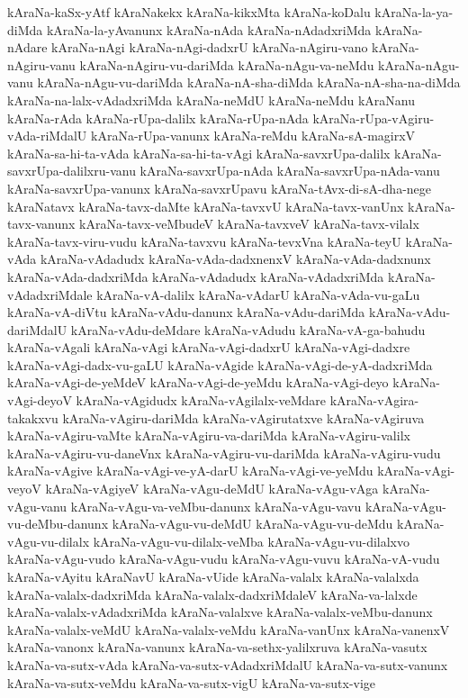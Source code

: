 {kAraNa-kaSx-yAtf
kAraNakekx
kAraNa-kikxMta
kAraNa-koDalu
kAraNa-la-ya-diMda
kAraNa-la-yAvanunx
kAraNa-nAda
kAraNa-nAdadxriMda
kAraNa-nAdare
kAraNa-nAgi
kAraNa-nAgi-dadxrU
kAraNa-nAgiru-vano
kAraNa-nAgiru-vanu
kAraNa-nAgiru-vu-dariMda
kAraNa-nAgu-va-neMdu
kAraNa-nAgu-vanu
kAraNa-nAgu-vu-dariMda
kAraNa-nA-sha-diMda
kAraNa-nA-sha-na-diMda
kAraNa-na-lalx-vAdadxriMda
kAraNa-neMdU
kAraNa-neMdu
kAraNanu
kAraNa-rAda
kAraNa-rUpa-dalilx
kAraNa-rUpa-nAda
kAraNa-rUpa-vAgiru-vAda-riMdalU
kAraNa-rUpa-vanunx
kAraNa-reMdu
kAraNa-sA-magirxV
kAraNa-sa-hi-ta-vAda
kAraNa-sa-hi-ta-vAgi
kAraNa-savxrUpa-dalilx
kAraNa-savxrUpa-dalilxru-vanu
kAraNa-savxrUpa-nAda
kAraNa-savxrUpa-nAda-vanu
kAraNa-savxrUpa-vanunx
kAraNa-savxrUpavu
kAraNa-tAvx-di-sA-dha-nege
kAraNatavx
kAraNa-tavx-daMte
kAraNa-tavxvU
kAraNa-tavx-vanUnx
kAraNa-tavx-vanunx
kAraNa-tavx-veMbudeV
kAraNa-tavxveV
kAraNa-tavx-vilalx
kAraNa-tavx-viru-vudu
kAraNa-tavxvu
kAraNa-tevxVna
kAraNa-teyU
kAraNa-vAda
kAraNa-vAdadudx
kAraNa-vAda-dadxnenxV
kAraNa-vAda-dadxnunx
kAraNa-vAda-dadxriMda
kAraNa-vAdadudx
kAraNa-vAdadxriMda
kAraNa-vAdadxriMdale
kAraNa-vA-dalilx
kAraNa-vAdarU
kAraNa-vAda-vu-gaLu
kAraNa-vA-diVtu
kAraNa-vAdu-danunx
kAraNa-vAdu-dariMda
kAraNa-vAdu-dariMdalU
kAraNa-vAdu-deMdare
kAraNa-vAdudu
kAraNa-vA-ga-bahudu
kAraNa-vAgali
kAraNa-vAgi
kAraNa-vAgi-dadxrU
kAraNa-vAgi-dadxre
kAraNa-vAgi-dadx-vu-gaLU
kAraNa-vAgide
kAraNa-vAgi-de-yA-dadxriMda
kAraNa-vAgi-de-yeMdeV
kAraNa-vAgi-de-yeMdu
kAraNa-vAgi-deyo
kAraNa-vAgi-deyoV
kAraNa-vAgidudx
kAraNa-vAgilalx-veMdare
kAraNa-vAgira-takakxvu
kAraNa-vAgiru-dariMda
kAraNa-vAgirutatxve
kAraNa-vAgiruva
kAraNa-vAgiru-vaMte
kAraNa-vAgiru-va-dariMda
kAraNa-vAgiru-valilx
kAraNa-vAgiru-vu-daneVnx
kAraNa-vAgiru-vu-dariMda
kAraNa-vAgiru-vudu
kAraNa-vAgive
kAraNa-vAgi-ve-yA-darU
kAraNa-vAgi-ve-yeMdu
kAraNa-vAgi-veyoV
kAraNa-vAgiyeV
kAraNa-vAgu-deMdU
kAraNa-vAgu-vAga
kAraNa-vAgu-vanu
kAraNa-vAgu-va-veMbu-danunx
kAraNa-vAgu-vavu
kAraNa-vAgu-vu-deMbu-danunx
kAraNa-vAgu-vu-deMdU
kAraNa-vAgu-vu-deMdu
kAraNa-vAgu-vu-dilalx
kAraNa-vAgu-vu-dilalx-veMba
kAraNa-vAgu-vu-dilalxvo
kAraNa-vAgu-vudo
kAraNa-vAgu-vudu
kAraNa-vAgu-vuvu
kAraNa-vA-vudu
kAraNa-vAyitu
kAraNavU
kAraNa-vUide
kAraNa-valalx
kAraNa-valalxda
kAraNa-valalx-dadxriMda
kAraNa-valalx-dadxriMdaleV
kAraNa-va-lalxde
kAraNa-valalx-vAdadxriMda
kAraNa-valalxve
kAraNa-valalx-veMbu-danunx
kAraNa-valalx-veMdU
kAraNa-valalx-veMdu
kAraNa-vanUnx
kAraNa-vanenxV
kAraNa-vanonx
kAraNa-vanunx
kAraNa-va-sethx-yalilxruva
kAraNa-vasutx
kAraNa-va-sutx-vAda
kAraNa-va-sutx-vAdadxriMdalU
kAraNa-va-sutx-vanunx
kAraNa-va-sutx-veMdu
kAraNa-va-sutx-vigU
kAraNa-va-sutx-vige
}

